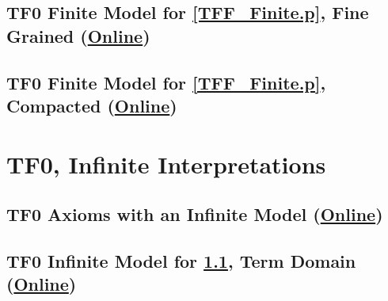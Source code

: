 \documentclass{easychair}
\begin{document}
\newpage
\subsection{TF0 Finite Model for \ref{TFF_Finite.p}, Fine Grained
(\href{https://raw.githubusercontent.com/GeoffsPapers/InterpretationFormat/master/Examples/TFF_Finite_Fine.s}{Online})}
\label{TFF_Finite_Fine.s}
\begin{small}

\end{small}

\newpage
\subsection{TF0 Finite Model for \ref{TFF_Finite.p}, Compacted
(\href{https://raw.githubusercontent.com/GeoffsPapers/InterpretationFormat/master/Examples/TFF_Finite_Compact.s}{Online})}
\label{TFF_Finite_Compact.s}
\begin{small}

\end{small}

\newpage
\section{TF0, Infinite Interpretations}
\label{TF0Infinite}

\subsection{TF0 Axioms with an Infinite Model
(\href{https://raw.githubusercontent.com/GeoffsPapers/InterpretationFormat/master/Examples/TFF_Infinite.p}{Online})}
\label{TFF_Infinite.p}
\begin{small}

\end{small}

\newpage
\subsection{TF0 Infinite Model for \ref{TFF_Infinite.p}, Term Domain
(\href{https://raw.githubusercontent.com/GeoffsPapers/InterpretationFormat/master/Examples/TFF_Peano.s}{Online})}
\label{TFF_Peano.s}
\begin{small}

\end{small}
\end{document}

